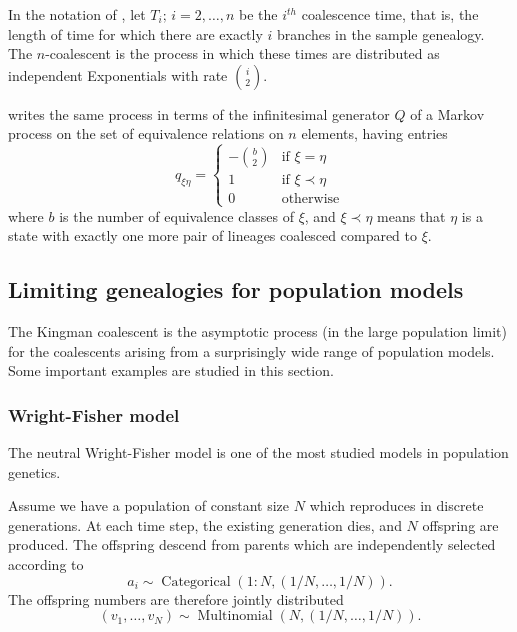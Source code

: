 \documentclass[fleqn]{article}
\theoremstyle{definition}
\newcommand{\Cat}{\operatorname{Categorical}}
\newcommand{\Mn}{\operatorname{Multinomial}}
\begin{document}
In the notation of \citet{wakeley2009}, let $T_i;\, i=2,\dots,n$ be the $i^{th}$ coalescence time, that is, the length of time for which there are exactly $i$ branches in the sample genealogy. The $n$-coalescent is the process in which these times are distributed as independent Exponentials with rate $\binom{i}{2}$.

\citet{mohle1998} writes the same process in terms of the infinitesimal generator $Q$ of a Markov process on the set of equivalence relations on $n$ elements, having entries
\begin{equation*}
q_{\xi\eta} =
\begin{cases}
-\binom{b}{2} &\text{if }\xi=\eta \\
1 & \text{if }\xi \prec\eta \\
0 & \text{otherwise}
\end{cases}
\end{equation*}
where $b$ is the number of equivalence classes of $\xi$, and $\xi \prec \eta$ means that $\eta$ is a state with exactly one more pair of lineages coalesced compared to $\xi$.
 

\subsection{Limiting genealogies for population models}
The Kingman coalescent is the asymptotic process (in the large population limit) for the coalescents arising from a surprisingly wide range of population models. Some important examples are studied in this section.

\subsubsection{Wright-Fisher model}
The neutral Wright-Fisher model \citep{fisher1923, fisher1930, wright1931} is one of the most studied models in population genetics.

Assume we have a population of constant size $N$ which reproduces in discrete generations.
At each time step, the existing generation dies, and $N$ offspring are produced. The offspring descend from parents which are independently selected according to
\begin{equation*}
a_i \sim \Cat(1:N, (1/N, \dots, 1/N)).
\end{equation*}
The offspring numbers are therefore jointly distributed
\begin{equation*}
(v_1,\dots, v_N) \sim \Mn(N, (1/N, \dots, 1/N)).
\end{equation*}
\end{document}

